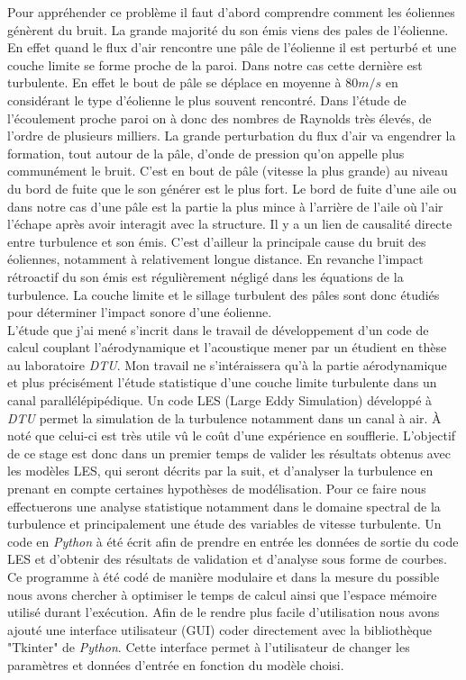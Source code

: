 \documentclass[12pt]{article}
\theoremstyle{plain}
\theoremstyle{remark}
\begin{document}
	Pour appréhender ce problème il faut d'abord comprendre comment les éoliennes génèrent du bruit. La grande majorité du son émis viens des pales de l'éolienne. En effet quand le flux d'air rencontre une pâle de l'éolienne il est perturbé et une couche limite se forme proche de la paroi. Dans notre cas cette dernière est turbulente. En effet le bout de pâle se déplace en moyenne à $80 m/s$ en considérant le type d'éolienne le plus souvent rencontré. Dans l'étude de l'écoulement proche paroi on à donc des nombres  de Raynolds très élevés, de l'ordre de plusieurs milliers. La grande perturbation du flux d'air va engendrer la formation, tout autour de la pâle, d'onde de pression qu'on appelle plus communément le bruit. C'est en bout de pâle (vitesse la plus grande) au niveau du bord de fuite que le son générer est le plus fort. Le bord de fuite d'une aile ou dans notre cas d'une pâle est la partie la plus mince à l'arrière de l'aile où l'air l'échape après avoir interagit avec la structure. Il y a un lien de causalité directe entre turbulence et son émis. C'est d'ailleur la principale cause du bruit des éoliennes, notamment à relativement longue distance. En revanche l'impact rétroactif du son émis est régulièrement négligé dans les équations de la turbulence. La couche limite et le sillage turbulent des pâles sont donc étudiés pour déterminer l'impact sonore d'une éolienne.\\
	
	L'étude que j'ai mené s'incrit dans le travail de développement d'un code de calcul couplant l'aérodynamique et l'acoustique mener par un étudient en thèse au laboratoire \textit{DTU}. Mon travail ne s'intéraissera qu'à la partie aérodynamique et plus précisément l'étude statistique d'une couche limite turbulente dans un canal parallélépipédique. Un code LES (Large Eddy Simulation) développé à \textit{DTU} permet la simulation de la turbulence notamment dans un canal à air. À noté que celui-ci est très utile vû le coût d'une expérience en soufflerie. L'objectif de ce stage est donc dans un premier temps de valider les résultats obtenus avec les modèles LES, qui seront décrits par la suit, et d'analyser la turbulence en prenant en compte certaines hypothèses de modélisation. Pour ce faire nous effectuerons une analyse statistique notamment dans le domaine spectral de la turbulence et principalement une étude des variables de vitesse turbulente. Un code en \textit{Python} à été écrit afin de prendre en entrée les données de sortie du code LES et d'obtenir des résultats de validation et d'analyse sous forme de courbes. Ce programme à été codé de manière modulaire et dans la mesure du possible nous avons chercher à optimiser le temps de calcul ainsi que l'espace mémoire utilisé durant l'exécution. Afin de le rendre plus facile d'utilisation nous avons ajouté une interface utilisateur (GUI) coder directement avec la bibliothèque "Tkinter" de \textit{Python}. Cette interface permet à l'utilisateur de changer les paramètres et données d'entrée en fonction du modèle choisi.\\
	
\end{document}
